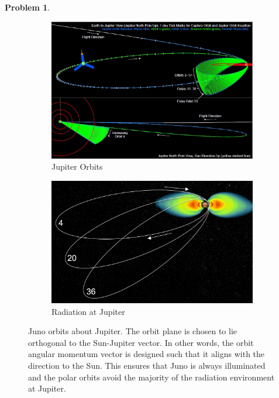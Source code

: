 \documentclass[10pt]{article}
\theoremstyle{definition}
\newtheorem{prob}{Problem}[section]
\begin{document}
\begin{prob}
    \begin{figure}[htbp]
        \centering
        \begin{subfigure}[htbp]{0.7\textwidth} 
            \includegraphics[width=\textwidth,keepaspectratio]{figures/jupiter_orbit.jpg} 
            \caption{ Jupiter Orbits} 
        \end{subfigure}

        \begin{subfigure}[htbp]{0.7\textwidth} 
            \includegraphics[width=\textwidth,keepaspectratio]{figures/jupiter_radiation.jpg} 
            \caption{Radiation at Jupiter} 
        \end{subfigure} 
        \caption{Juno orbits about Jupiter. The orbit plane is chosen to lie orthogonal to the Sun-Jupiter vector. In other words, the orbit angular momentum vector is designed such that it aligns with the direction to the Sun. This ensures that Juno is always illuminated and the polar orbits avoid the majority of the radiation environment at Jupiter.~\label{fig:jupiter_orbit}}
    \end{figure}
\end{prob}
\end{document}
